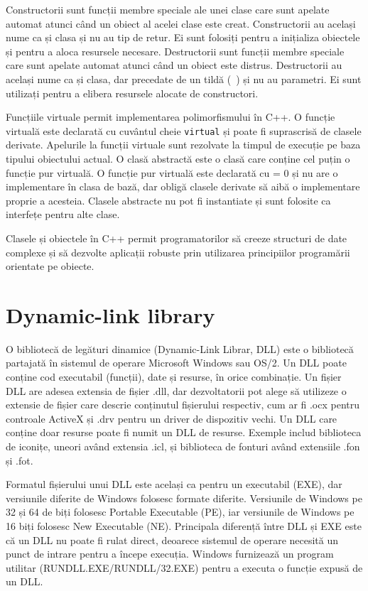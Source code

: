 \documentclass[a4paper,12pt]{report}
\begin{document}
Constructorii sunt funcții membre speciale ale unei clase care sunt apelate automat atunci când un obiect al acelei clase este creat. Constructorii au același nume ca și clasa și nu au tip de retur. Ei sunt folosiți pentru a inițializa obiectele și pentru a aloca resursele necesare. Destructorii sunt funcții membre speciale care sunt apelate automat atunci când un obiect este distrus. Destructorii au același nume ca și clasa, dar precedate de un tildă (~) și nu au parametri. Ei sunt utilizați pentru a elibera resursele alocate de constructori.

Funcțiile virtuale permit implementarea polimorfismului în C++. O funcție virtuală este declarată cu cuvântul cheie \texttt{virtual} și poate fi suprascrisă de clasele derivate. Apelurile la funcții virtuale sunt rezolvate la timpul de execuție pe baza tipului obiectului actual. O clasă abstractă este o clasă care conține cel puțin o funcție pur virtuală. O funcție pur virtuală este declarată cu = 0 și nu are o implementare în clasa de bază, dar obligă clasele derivate să aibă o implementare proprie a acesteia. Clasele abstracte nu pot fi instantiate și sunt folosite ca interfețe pentru alte clase.

Clasele și obiectele în C++ permit programatorilor să creeze structuri de date complexe și să dezvolte aplicații robuste prin utilizarea principiilor programării orientate pe obiecte.

\section{Dynamic-link library}
O bibliotecă de legături dinamice (Dynamic-Link Librar, DLL) este o bibliotecă partajată în sistemul de operare Microsoft Windows sau OS/2. Un DLL poate conține cod executabil (funcții), date și resurse, în orice combinație. Un fișier DLL are adesea extensia de fișier .dll, dar dezvoltatorii pot alege să utilizeze o extensie de fișier care descrie conținutul fișierului respectiv, cum ar fi .ocx pentru controale ActiveX și .drv pentru un driver de dispozitiv vechi. Un DLL care conține doar resurse poate fi numit un DLL de resurse. Exemple includ biblioteca de iconițe, uneori având extensia .icl, și biblioteca de fonturi având extensiile .fon și .fot.

Formatul fișierului unui DLL este același ca pentru un executabil (EXE), dar versiunile diferite de Windows folosesc formate diferite. Versiunile de Windows pe 32 și 64 de biți folosesc Portable Executable (PE), iar versiunile de Windows pe 16 biți folosesc New Executable (NE). Principala diferență între DLL și EXE este că un DLL nu poate fi rulat direct, deoarece sistemul de operare necesită un punct de intrare pentru a începe execuția. Windows furnizează un program utilitar (RUNDLL.EXE/RUNDLL/32.EXE) pentru a executa o funcție expusă de un DLL.
\end{document}
